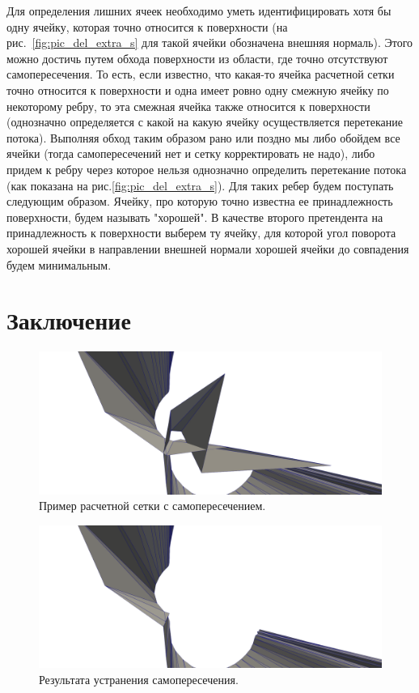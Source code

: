 \documentclass[
11pt,%
tightenlines,%
twoside,%
onecolumn,%
nofloats,%
nobibnotes,%
nofootinbib,%
superscriptaddress,%
noshowpacs,%
centertags]%
{revtex4}
\begin{document}
Для определения лишних ячеек необходимо уметь идентифицировать хотя бы одну ячейку, которая точно относится к поверхности (на рис.~\ref{fig:pic_del_extra_s} для такой ячейки обозначена внешняя нормаль).
Этого можно достичь путем обхода поверхности из области, где точно отсутствуют самопересечения.
То есть, если известно, что какая-то ячейка расчетной сетки точно относится к поверхности и одна имеет ровно одну смежную ячейку по некоторому ребру, то эта смежная ячейка также относится к поверхности (однозначно определяется с какой на какую ячейку осуществляется перетекание потока).
Выполняя обход таким образом рано или поздно мы либо обойдем все ячейки (тогда самопересечений нет и сетку корректировать не надо), либо придем к ребру через которое нельзя однозначно определить перетекание потока (как показана на рис.\ref{fig:pic_del_extra_s}).
Для таких ребер будем поступать следующим образом.
Ячейку, про которую точно известна ее принадлежность поверхности, будем называть "хорошей".
В качестве второго претендента на принадлежность к поверхности выберем ту ячейку, для которой угол поворота хорошей ячейки в направлении внешней нормали хорошей ячейки до совпадения будем минимальным.

\section{Заключение}

\begin{figure}[h]
\includegraphics[width=1.0\textwidth]{pics/pic_example_before.png}
\caption{Пример расчетной сетки с самопересечением.}\label{fig:pic_example_before}
\end{figure}

\begin{figure}[h]
\includegraphics[width=1.0\textwidth]{pics/pic_example_after.png}
\caption{Результата устранения самопересечения.}\label{fig:pic_example_after}
\end{figure}
\end{document}
